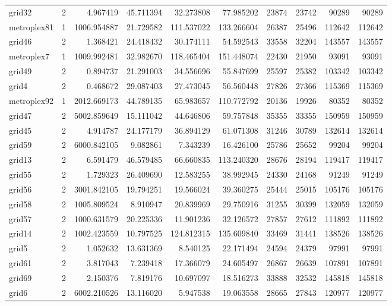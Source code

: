 \begin{longtable}{|l|r|r|r|r|r|r|r|r|r|}
grid32 & 2 & 4.967419 & 45.711394 & 32.273808 & 77.985202 & 23874 & 23742 & 90289 & 90289 \\
metroplex81 & 1 & 1006.954887 & 21.729582 & 111.537022 & 133.266604 & 26387 & 25496 & 112642 & 112642 \\
grid46 & 2 & 1.368421 & 24.418432 & 30.174111 & 54.592543 & 33558 & 32204 & 143557 & 143557 \\
metroplex7 & 1 & 1009.992481 & 32.982670 & 118.465404 & 151.448074 & 22430 & 21950 & 93091 & 93091 \\
grid49 & 2 & 0.894737 & 21.291003 & 34.556696 & 55.847699 & 25597 & 25382 & 103342 & 103342 \\
grid4 & 2 & 0.468672 & 29.087403 & 27.473045 & 56.560448 & 27826 & 27366 & 115369 & 115369 \\
metroplex92 & 1 & 2012.669173 & 44.789135 & 65.983657 & 110.772792 & 20136 & 19926 & 80352 & 80352 \\
grid47 & 2 & 5002.859649 & 15.111042 & 44.646806 & 59.757848 & 35355 & 33355 & 150959 & 150959 \\
grid45 & 2 & 4.914787 & 24.177179 & 36.894129 & 61.071308 & 31246 & 30789 & 132614 & 132614 \\
grid59 & 2 & 6000.842105 & 9.082861 & 7.343239 & 16.426100 & 25786 & 25652 & 99204 & 99204 \\
grid13 & 2 & 6.591479 & 46.579485 & 66.660835 & 113.240320 & 28676 & 28194 & 119417 & 119417 \\
grid55 & 2 & 1.729323 & 26.409690 & 12.583255 & 38.992945 & 24330 & 24168 & 91249 & 91249 \\
grid56 & 2 & 3001.842105 & 19.794251 & 19.566024 & 39.360275 & 25444 & 25015 & 105176 & 105176 \\
grid58 & 2 & 1005.809524 & 8.910947 & 20.839969 & 29.750916 & 31255 & 30399 & 132059 & 132059 \\
grid57 & 2 & 1000.631579 & 20.225336 & 11.901236 & 32.126572 & 27857 & 27612 & 111892 & 111892 \\
grid14 & 2 & 1002.423559 & 10.797525 & 124.812315 & 135.609840 & 33469 & 31441 & 138526 & 138526 \\
grid5 & 2 & 1.052632 & 13.631369 & 8.540125 & 22.171494 & 24594 & 24379 & 97991 & 97991 \\
grid61 & 2 & 3.817043 & 7.239418 & 17.366079 & 24.605497 & 26867 & 26639 & 107891 & 107891 \\
grid69 & 2 & 2.150376 & 7.819176 & 10.697097 & 18.516273 & 33888 & 32532 & 145818 & 145818 \\
grid6 & 2 & 6002.210526 & 13.116020 & 5.947538 & 19.063558 & 28665 & 27843 & 120977 & 120977 \\

\end{longtable}
